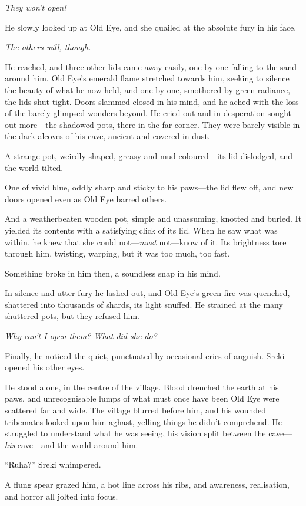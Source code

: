 \emph{They won't open!}

He slowly looked up at Old Eye, and she quailed at the absolute fury in his face.

\emph{The others will, though.}

He reached, and three other lids came away easily, one by one falling to the sand around him. Old Eye's emerald flame stretched towards him, seeking to silence the beauty of what he now held, and one by one, smothered by green radiance, the lids shut tight. Doors slammed closed in his mind, and he ached with the loss of the barely glimpsed wonders beyond. He cried out and in desperation sought out more---the shadowed pots, there in the far corner. They were barely visible in the dark alcoves of his cave, ancient and covered in dust.

A strange pot, weirdly shaped, greasy and mud-coloured---its lid dislodged, and the world tilted.

One of vivid blue, oddly sharp and sticky to his paws---the lid flew off, and new doors opened even as Old Eye barred others.

And a weatherbeaten wooden pot, simple and unassuming, knotted and burled. It yielded its contents with a satisfying click of its lid. When he saw what was within, he knew that she could not---\emph{must} not---know of it. Its brightness tore through him, twisting, warping, but it was too much, too fast.

Something broke in him then, a soundless snap in his mind.

In silence and utter fury he lashed out, and Old Eye's green fire was quenched, shattered into thousands of shards, its light snuffed. He strained at the many shuttered pots, but they refused him.

\emph{Why can't I open them? What did she do?}

Finally, he noticed the quiet, punctuated by occasional cries of anguish. Sreki opened his other eyes.

He stood alone, in the centre of the village. Blood drenched the earth at his paws, and unrecognisable lumps of what must once have been Old Eye were scattered far and wide. The village blurred before him, and his wounded tribemates looked upon him aghast, yelling things he didn't comprehend. He struggled to understand what he was seeing, his vision split between the cave---\emph{his} cave---and the world around him.

``Ruha?'' Sreki whimpered.

A flung spear grazed him, a hot line across his ribs, and awareness, realisation, and horror all jolted into focus.

